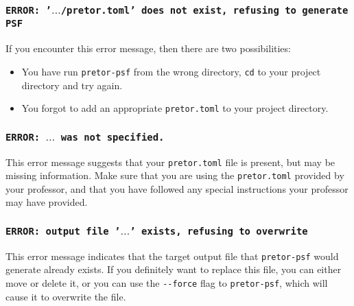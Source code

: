 \documentclass{article}
\begin{document}
\subsubsection{\texttt{ERROR: '$\hdots$/pretor.toml' does not exist, refusing to generate PSF}}

If you encounter this error message, then there are two possibilities:

\begin{itemize}

	\item You have run \texttt{pretor-psf} from the wrong directory,
		\texttt{cd} to your project directory and try again.

	\item You forgot to add an appropriate \texttt{pretor.toml} to your
		project directory.

\end{itemize}

\subsubsection{\texttt{ERROR: $\hdots$ was not specified.}}

This error message suggests that your \texttt{pretor.toml} file is present, but
may be missing information. Make sure that you are using the
\texttt{pretor.toml} provided by your professor, and that you have followed any
special instructions your professor may have provided.

\subsubsection{\texttt{ERROR: output file '$\hdots$' exists, refusing to overwrite}}

This error message indicates that the target output file that
\texttt{pretor-psf} would generate already exists. If you definitely want to
replace this file, you can either move or delete it, or you can use the
\texttt{-{}-force} flag to \texttt{pretor-psf}, which will cause it to overwrite
the file.
\end{document}
